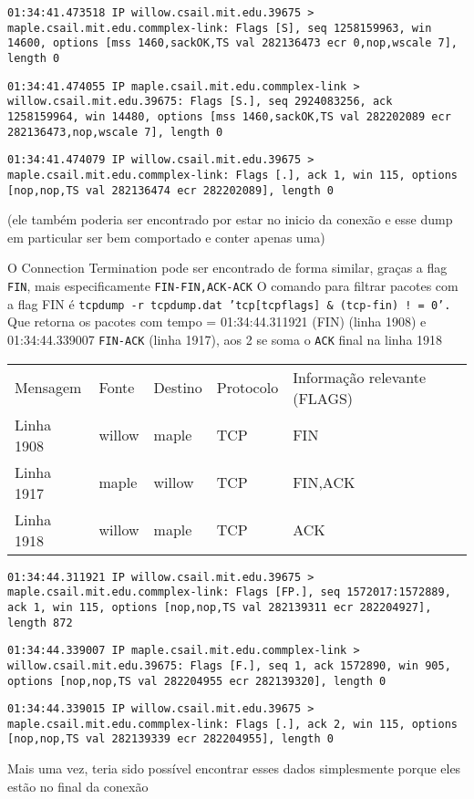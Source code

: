 \documentclass[11pt]{article}
\begin{document}
\texttt{01:34:41.473518 IP willow.csail.mit.edu.39675 > maple.csail.mit.edu.commplex-link: Flags [S], seq 1258159963, win 14600, options [mss 1460,sackOK,TS val 282136473 ecr 0,nop,wscale 7], length 0}

\texttt{01:34:41.474055 IP maple.csail.mit.edu.commplex-link > willow.csail.mit.edu.39675: Flags [S.], seq 2924083256, ack 1258159964, win 14480, options [mss 1460,sackOK,TS val 282202089 ecr 282136473,nop,wscale 7], length 0}

\texttt{01:34:41.474079 IP willow.csail.mit.edu.39675 > maple.csail.mit.edu.commplex-link: Flags [.], ack 1, win 115, options [nop,nop,TS val 282136474 ecr 282202089], length 0}

(ele também poderia ser encontrado por estar no inicio da conexão e esse
dump em particular ser bem comportado e conter apenas uma)

O Connection Termination pode ser encontrado de forma similar, graças a
flag \texttt{FIN}, mais especificamente \texttt{FIN-FIN,ACK-ACK}
O comando para filtrar pacotes com a flag FIN é 
\texttt{tcpdump -r tcpdump.dat 'tcp[tcpflags] \& (tcp-fin) ! = 0'.}
Que retorna os pacotes com tempo = 01:34:44.311921 (FIN) (linha 1908) e 
01:34:44.339007 \texttt{FIN-ACK} (linha 1917), aos 2 se soma o \texttt{ACK} final na linha
1918
\begin{center}
\begin{tabular}{lllll}
Mensagem & Fonte & Destino & Protocolo & Informação relevante (FLAGS)\\
Linha 1908 & willow & maple & TCP & FIN\\
Linha 1917 & maple & willow & TCP & FIN,ACK\\
Linha 1918 & willow & maple & TCP & ACK\\
\end{tabular}
\end{center}

\texttt{01:34:44.311921 IP willow.csail.mit.edu.39675 > maple.csail.mit.edu.commplex-link: Flags [FP.], seq 1572017:1572889, ack 1, win 115, options [nop,nop,TS val 282139311 ecr 282204927], length 872}

\texttt{01:34:44.339007 IP maple.csail.mit.edu.commplex-link > willow.csail.mit.edu.39675: Flags [F.], seq 1, ack 1572890, win 905, options [nop,nop,TS val 282204955 ecr 282139320], length 0}

\texttt{01:34:44.339015 IP willow.csail.mit.edu.39675 > maple.csail.mit.edu.commplex-link: Flags [.], ack 2, win 115, options [nop,nop,TS val 282139339 ecr 282204955], length 0}


Mais uma vez, teria sido possível encontrar esses dados simplesmente porque
eles estão no final da conexão
\end{document}
